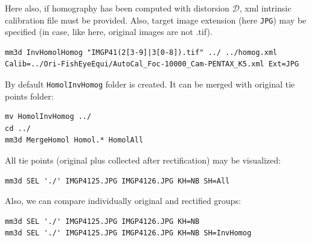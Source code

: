 \noindent Here also, if homography has been computed with distorsion $\mathcal{D}$, xml intrinsic calibration file must be provided. Also, target image extension (here \texttt{JPG}) may be specified (in case, like here, original images are not .tif). \newline

\begin{verbatim}
mm3d InvHomolHomog "IMGP41(2[3-9]|3[0-8]).tif" ../ ../homog.xml
Calib=../Ori-FishEyeEqui/AutoCal_Foc-10000_Cam-PENTAX_K5.xml Ext=JPG
\end{verbatim} 


\noindent By default \texttt{HomolInvHomog} folder is created. It can be merged with original tie points folder: \newline

\begin{verbatim}
mv HomolInvHomog ../
cd ../
mm3d MergeHomol Homol.* HomolAll
\end{verbatim} 

\noindent All tie points (original plus collected after rectification) may be visualized: \newline

\begin{verbatim}
mm3d SEL './' IMGP4125.JPG IMGP4126.JPG KH=NB SH=All
\end{verbatim} 

\noindent Also, we can compare individually original and rectified groups: \newline

\begin{verbatim}
mm3d SEL './' IMGP4125.JPG IMGP4126.JPG KH=NB
mm3d SEL './' IMGP4125.JPG IMGP4126.JPG KH=NB SH=InvHomog
\end{verbatim} 

